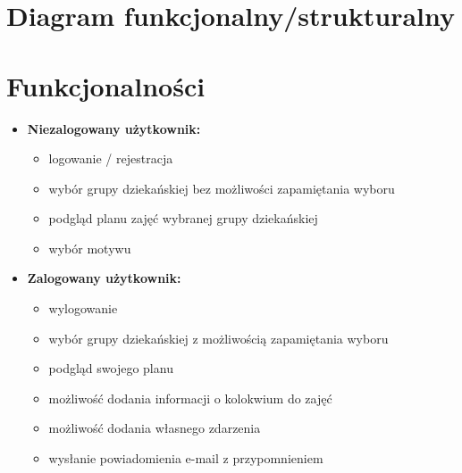 \documentclass[a4paper,11pt]{uzreport}
\begin{document}
\section{Diagram funkcjonalny/strukturalny}


    
\clearpage
\section{Funkcjonalności}
    \begin{itemize}[leftmargin=0.50in]
    
     \item \textbf{Niezalogowany użytkownik:}
            \begin{itemize}[leftmargin=0.25in]
            
                \item logowanie / rejestracja

                \item wybór grupy dziekańskiej bez możliwości zapamiętania wyboru
                
                \item podgląd planu zajęć wybranej grupy dziekańskiej
                
                \item wybór motywu
                
            \end{itemize}

     \item \textbf{Zalogowany użytkownik:}
            \begin{itemize}[leftmargin=0.25in]
            
                \item wylogowanie

                \item wybór grupy dziekańskiej z możliwością zapamiętania wyboru
                
                \item podgląd swojego planu
                
                \item możliwość dodania informacji o kolokwium do zajęć
                
                \item możliwość dodania własnego zdarzenia
                
                \item wysłanie powiadomienia e-mail z przypomnieniem
                

\end{itemize}
\end{itemize}
\end{document}
